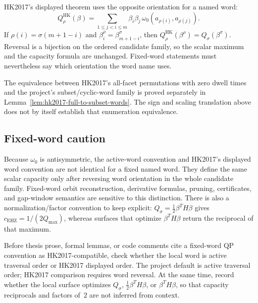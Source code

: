 HK2017's displayed theorem uses the opposite orientation for a named word:
\[
  Q^{\mathrm{HK}}_\rho(\beta)
  =
  \sum_{1\leq j<i\leq m}
    \beta_i\beta_j\,
    \omega_0(a_{\rho(i)},a_{\rho(j)}).
\]
If \(\rho(i)=\sigma(m+1-i)\) and
\(\beta^{\rho}_i=\beta^{\sigma}_{m+1-i}\), then
\(Q^{\mathrm{HK}}_\rho(\beta^\rho)=Q_\sigma(\beta^\sigma)\).  Reversal is a
bijection on the ordered candidate family, so the scalar maximum and the
capacity formula are unchanged.  Fixed-word statements must nevertheless say
which orientation the word name uses.

The equivalence between HK2017's all-facet permutations with zero dwell times
and the project's subset/cyclic-word family is proved separately in
Lemma~\ref{lem:hk2017-full-to-subset-words}.  The sign and scaling translation
above does not by itself establish that enumeration equivalence.

\subsection{Fixed-word caution}
\label{subsec:hk2017-fixed-word-caution}

Because \(\omega_0\) is antisymmetric, the active-word convention and HK2017's
displayed word convention are not identical for a fixed named word.  They define
the same scalar capacity only after reversing word orientation in the whole
candidate family.  Fixed-word orbit reconstruction, derivative formulas,
pruning, certificates, and gap-window semantics are sensitive to this
distinction. There is also a normalization/factor convention to keep explicit:
\(Q_\sigma=\frac12\beta^TH\beta\) gives \(c_{\mathrm{EHZ}}=1/(2Q_{\max})\),
whereas surfaces that optimize \(\beta^TH\beta\) return the reciprocal of that
maximum.

\begin{unverified}
\begin{remark}\label{rem:hk2017-q-word-orientation-audit}
Before thesis prose, formal lemmas, or code comments cite a fixed-word QP
convention as HK2017-compatible, check whether the local word is active
traversal order or HK2017 displayed order.  The project default is active
traversal order; HK2017 comparison requires word reversal.  At the same time,
record whether the local surface optimizes \(Q_\sigma\),
\(\frac12\beta^TH\beta\), or \(\beta^TH\beta\), so that capacity reciprocals
and factors of~\(2\) are not inferred from context.
\end{remark}
\end{unverified}

